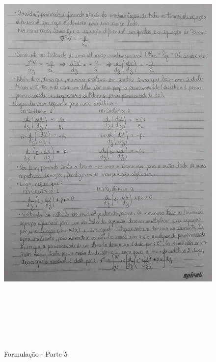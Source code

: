 \documentclass[10pt]{article}
\begin{document}
    \begin{figure}[!htb]
    \centerline{\includegraphics[width=20cm,height=22cm]{Formulação Matemática/Formulacao - Parte 5.jpg}}
    \caption{Formulação - Parte 5}
    \label{fig:fp5}
    \end{figure}
    
\end{document}
